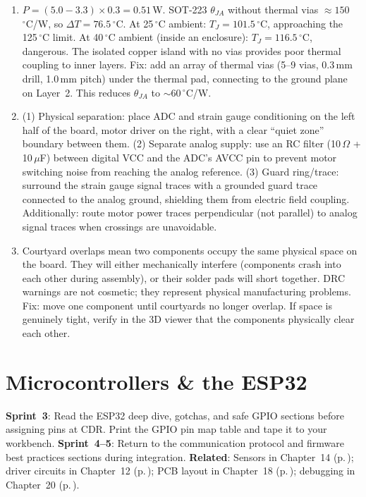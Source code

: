 \documentclass[11pt,letterpaper,twoside,openany]{book}
\newcommand{\degC}{\ensuremath{{}^{\circ}\text{C}}}
\begin{document}
\begin{enumerate}[leftmargin=1.5em]
\item $P = (5.0 - 3.3) \times 0.3 = 0.51$\,W. SOT-223 $\theta_{JA}$ without thermal vias $\approx 150$\,\degC{}/W, so $\Delta T = 76.5$\,\degC{}. At 25\,\degC{} ambient: $T_J = 101.5$\,\degC{}, approaching the 125\,\degC{} limit. At 40\,\degC{} ambient (inside an enclosure): $T_J = 116.5$\,\degC{}, dangerous. The isolated copper island with no vias provides poor thermal coupling to inner layers. Fix: add an array of thermal vias (5--9 vias, 0.3\,mm drill, 1.0\,mm pitch) under the thermal pad, connecting to the ground plane on Layer~2. This reduces $\theta_{JA}$ to $\sim$60\,\degC{}/W.
\item (1) Physical separation: place ADC and strain gauge conditioning on the left half of the board, motor driver on the right, with a clear ``quiet zone'' boundary between them. (2) Separate analog supply: use an RC filter (10\,$\Omega$ + 10\,$\mu$F) between digital VCC and the ADC's AVCC pin to prevent motor switching noise from reaching the analog reference. (3) Guard ring/trace: surround the strain gauge signal traces with a grounded guard trace connected to the analog ground, shielding them from electric field coupling. Additionally: route motor power traces perpendicular (not parallel) to analog signal traces when crossings are unavoidable.
\item Courtyard overlaps mean two components occupy the same physical space on the board. They will either mechanically interfere (components crash into each other during assembly), or their solder pads will short together. DRC warnings are not cosmetic; they represent physical manufacturing problems. Fix: move one component until courtyards no longer overlap. If space is genuinely tight, verify in the 3D viewer that the components physically clear each other.
\end{enumerate}


\chapter{Microcontrollers \& the ESP32}\label{ch:mcu}

\begin{tipbox}
\textbf{Sprint~3}: Read the ESP32 deep dive, gotchas, and safe GPIO sections before assigning pins at CDR. Print the GPIO pin map table and tape it to your workbench. \textbf{Sprint~4--5}: Return to the communication protocol and firmware best practices sections during integration. \textbf{Related}: Sensors in Chapter~14 (p.\,\pageref{ch:sensors}); driver circuits in Chapter~12 (p.\,\pageref{ch:power}); PCB layout in Chapter~18 (p.\,\pageref{ch:pcb}); debugging in Chapter~20 (p.\,\pageref{ch:debug}).
\end{tipbox}
\end{document}
